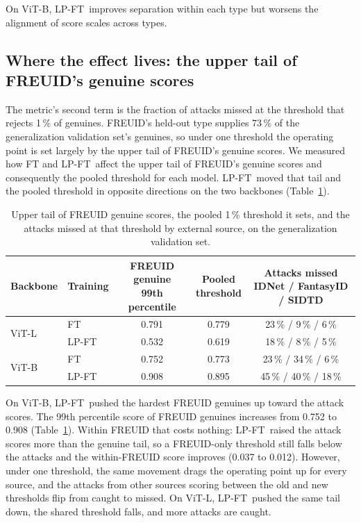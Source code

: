 \documentclass[10pt]{article}
\newcommand{\lpft}{LP-FT}
\newcommand{\genval}{generalization validation set}
\begin{document}
On ViT-B, \lpft\ improves separation within each type but worsens the alignment of score scales across types.

\subsection{Where the effect lives: the upper tail of FREUID's genuine scores}
\label{sec:tail}
The metric's second term is the fraction of attacks missed at the threshold that rejects 1\,\% of genuines. FREUID's held-out type supplies 73\,\% of the \genval's genuines, so under one threshold the operating point is set largely by the upper tail of FREUID's genuine scores. We measured how FT and \lpft\ affect the upper tail of FREUID's genuine scores and consequently the pooled threshold for each model. \lpft\ moved that tail and the pooled threshold in opposite directions on the two backbones (Table~\ref{tab:tail}).

\begin{table}[t]
  \caption{Upper tail of FREUID genuine scores, the pooled 1\,\% threshold it sets, and the attacks missed at that threshold by external source, on the \genval.}
  \label{tab:tail}
  \centering
  \footnotesize
  \begin{tabular}{@{}llccc@{}}
    \toprule
    Backbone & Training & \shortstack{FREUID genuine\\99th percentile} & \shortstack{Pooled\\threshold} & \shortstack{Attacks missed\\IDNet / FantasyID / SIDTD} \\
    \midrule
    \multirow{2}{*}{ViT-L} & FT    & 0.791 & 0.779 & 23\,\% / 9\,\% / 6\,\% \\
                           & \lpft & 0.532 & 0.619 & 18\,\% / 8\,\% / 5\,\% \\
    \midrule
    \multirow{2}{*}{ViT-B} & FT    & 0.752 & 0.773 & 23\,\% / 34\,\% / 6\,\% \\
                           & \lpft & 0.908 & 0.895 & 45\,\% / 40\,\% / 18\,\% \\
    \bottomrule
  \end{tabular}
\end{table}

On ViT-B, \lpft\ pushed the hardest FREUID genuines up toward the attack scores. The 99th percentile score of FREUID genuines increases from 0.752 to 0.908 (Table~\ref{tab:tail}). Within FREUID that costs nothing: \lpft\ raised the attack scores more than the genuine tail, so a FREUID-only threshold still falls below the attacks and the within-FREUID score improves (0.037 to 0.012). However, under one threshold, the same movement drags the operating point up for every source, and the attacks from other sources scoring between the old and new thresholds flip from caught to missed. On ViT-L, \lpft\ pushed the same tail down, the shared threshold falls, and more attacks are caught.
\end{document}
